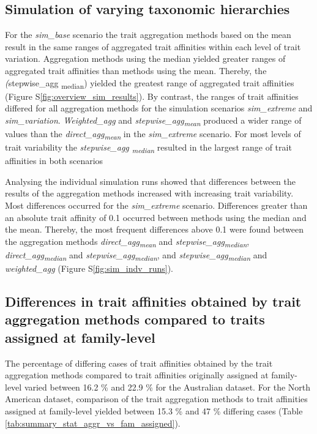 \documentclass[../Draft_harmonization_paper.tex]{subfiles}
\begin{document}
\subsection*{Simulation of varying taxonomic hierarchies}

For the \textit{sim\_base} scenario the trait aggregation methods based on the mean result in the same ranges of aggregated trait affinities within each level of trait variation. Aggregation methods using the median yielded greater ranges of aggregated trait affinities than methods using the mean. Thereby, the \textit(stepwise\_agg \textsubscript{median}) yielded the greatest range of aggregated trait affinities (Figure S\ref{fig:overview_sim_results}).  By contrast, the ranges of trait affinities differed for all aggregation methods for the simulation scenarios \textit{sim\_extreme} and \textit{sim\_variation}. \textit{Weighted\_agg} and \textit{stepwise\_agg\textsubscript{mean}} produced a wider range of values than the \textit{direct\_agg\textsubscript{mean}} in the \textit{sim\_extreme} scenario. For most levels of trait variability the \textit{stepwise\_agg \textsubscript{median}} resulted in the largest range of trait affinities in both scenarios

Analysing the individual simulation runs showed that differences between the results of the aggregation methods increased with increasing trait variability. Most differences occurred for the \textit{sim\_extreme} scenario. Differences greater than an absolute trait affinity of 0.1 occurred between methods using the median and the mean. Thereby, the most frequent differences above 0.1 were found between the aggregation methods \textit{direct\_agg\textsubscript{mean}} and \textit{stepwise\_agg\textsubscript{median}}, \textit{direct\_agg\textsubscript{median}} and \textit{stepwise\_agg\textsubscript{median}}, and \textit{stepwise\_agg\textsubscript{median}} and \textit{weighted\_agg} (Figure S\ref{fig:sim_indv_runs}). 

\subsection*{Differences in trait affinities obtained by trait aggregation methods compared to traits assigned at family-level}
\label{sec:diff_trait_agg_chessman}

The percentage of differing cases of trait affinities obtained by the trait aggregation methods compared to trait affinities originally assigned at family-level varied between 16.2 \% and 22.9 \% for the Australian dataset. For the North American dataset, comparison of the trait aggregation methods to trait affinities assigned at family-level yielded between 15.3 \% and 47 \% differing cases (Table \ref{tab:summary_stat_aggr_vs_fam_assigned}).
\end{document}
